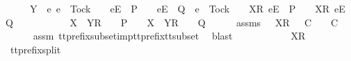 \begin{isabellebody}
\ \ \ \ {\isasymand}\ Y\ {\isasyminter}\ {\isacharbraceleft}e{\isachardot}\ e\ {\isasymnoteq}\ Tock\ {\isasymand}\ {\isasymrho}\ {\isacharat}\ {\isacharbrackleft}{\isacharbrackleft}e{\isacharbrackright}\isactrlsub E{\isacharbrackright}\ {\isasymin}\ P\ {\isasymand}\ {\isasymrho}\ {\isacharat}\ {\isacharbrackleft}{\isacharbrackleft}e{\isacharbrackright}\isactrlsub E{\isacharbrackright}\ {\isasymin}\ Q\ {\isasymor}\ e\ {\isacharequal}\ Tock\ {\isasymand}\ {\isasymrho}\ {\isacharat}\ {\isacharbrackleft}{\isacharbrackleft}X{\isacharbrackright}\isactrlsub R{\isacharcomma}\ {\isacharbrackleft}e{\isacharbrackright}\isactrlsub E{\isacharbrackright}\ {\isasymin}\ P\ {\isasymand}\ {\isasymrho}\ {\isacharat}\ {\isacharbrackleft}{\isacharbrackleft}X{\isacharbrackright}\isactrlsub R{\isacharcomma}\ {\isacharbrackleft}e{\isacharbrackright}\isactrlsub E{\isacharbrackright}\ {\isasymin}\ Q{\isacharbraceright}\ {\isacharequal}\ {\isacharbraceleft}{\isacharbraceright}\ {\isasymlongrightarrow}\isanewline
\ \ \ \ \ \ {\isasymrho}\ {\isacharat}\ {\isacharbrackleft}X\ {\isasymunion}\ Y{\isacharbrackright}\isactrlsub R\ {\isacharhash}\ {\isasymsigma}{\isacharprime}\ {\isasymin}\ P\ {\isasymand}\ {\isasymrho}\ {\isacharat}\ {\isacharbrackleft}X\ {\isasymunion}\ Y{\isacharbrackright}\isactrlsub R\ {\isacharhash}\ {\isasymsigma}{\isacharprime}\ {\isasymin}\ Q{\isachardoublequoteclose}\isanewline
\ \ \isamarkupfalse%
\ {\isasymtau}\ \ {\isasymtau}{\isacharunderscore}assms{\isacharcolon}\ {\isachardoublequoteopen}{\isasymrho}{\isacharprime}\ {\isacharat}\ {\isacharbrackleft}X{\isacharbrackright}\isactrlsub R\ {\isacharhash}\ {\isasymsigma}{\isacharprime}\ {\isasymle}\isactrlsub C\ {\isasymtau}\ {\isasymand}\ {\isasymtau}\ {\isasymsubseteq}\isactrlsub C\ {\isasymsigma}{\isachardoublequoteclose}\isanewline
\ \ \ \ \isamarkupfalse%
\ assm{}\ tt{\isacharunderscore}prefix{\isacharunderscore}subset{\isacharunderscore}imp{\isacharunderscore}tt{\isacharunderscore}prefix{\isacharunderscore}tt{\isacharunderscore}subset\ \isamarkupfalse%
\ blast\isanewline
\ \ \isamarkupfalse%
\ \isamarkupfalse%
\ {\isasymtau}{\isacharprime}\ \ {\isachardoublequoteopen}{\isasymtau}\ {\isacharequal}\ {\isasymrho}{\isacharprime}\ {\isacharat}\ {\isacharbrackleft}X{\isacharbrackright}\isactrlsub R\ {\isacharhash}\ {\isasymsigma}{\isacharprime}\ {\isacharat}\ {\isasymtau}{\isacharprime}{\isachardoublequoteclose}\isanewline
\ \ \ \ \isamarkupfalse%
\ tt{\isacharunderscore}prefix{\isacharunderscore}split\ \isamarkupfalse%

\end{isabellebody}
